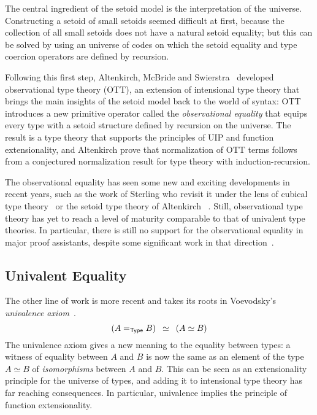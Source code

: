 The central ingredient of the setoid model is the interpretation of the 
universe.
% 
Constructing a setoid of small setoids seemed difficult at first, because 
the collection of all small setoids does not have a natural setoid equality;
but this can be solved by using an 
universe of codes on which the setoid equality and type coercion operators are 
defined by recursion.

Following this first step, Altenkirch, McBride and 
Swierstra~ developed observational 
type theory (OTT), an extension of intensional type theory that brings the main 
insights of the setoid model back to the world of syntax:
% 
OTT introduces a new primitive operator called the \emph{observational equality} that 
equips every type with a setoid structure defined by recursion on the universe.
% 
The result is a type theory that supports the principles of UIP and function 
extensionality, and Altenkirch \etal prove that normalization of OTT terms 
follows from a conjectured normalization result for type theory with 
induction-recursion.

The observational equality has seen some new and exciting developments in recent 
years, such as the work of Sterling \etal who revisit it under the lens of 
cubical type theory~ or the setoid
type theory of Altenkirch \etal~.
% 
Still, observational type theory has yet to reach a level of maturity 
comparable to that of univalent type theories.
% 
In particular, there is still no support for the observational equality in
major proof assistants, despite some significant work in that 
direction~.

\subsection{Univalent Equality}
\label{sec:univalence}

The other line of work is more recent and takes its roots in
Voevodsky's \emph{univalence axiom}~.
\[
(A =_{\mathsf{Type}} B) \enskip \simeq \enskip  (A \simeq B)
\]
The univalence axiom gives a new meaning to the equality between types: 
% 
% 
a witness of equality between \( A \) and \( B \) is now the same as an element of the type 
\( A \simeq B \) of \emph{isomorphisms} between \( A \) and \( B \). 
% 
This can be seen as an extensionality principle for the universe of types, and
adding it to intensional type theory has far reaching consequences. 
In particular, univalence implies the principle of function extensionality.

